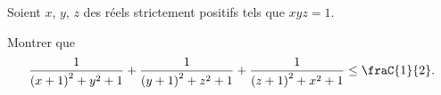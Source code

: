 \documentclass[varwidth]{standalone}
\begin{document}
    Soient $x$, $y$, $z$ des r\'eels strictement positifs tels que $xyz = 1$.

    Montrer que
    \[
        \frac{1}{{(x + 1)}^2 + y^2 + 1} + \frac{1}{{(y + 1)}^2 + z^2 + 1} + \frac{1}{{(z + 1)}^2 + x^2 + 1} \leq \fraC{1}{2}.
    \]
\end{document}

